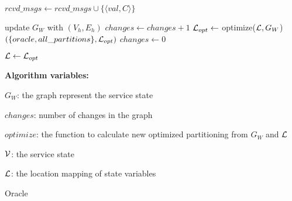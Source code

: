 \begin{algorithm}[htbp!]
\begin{distribalgo}[1]
\vspace{1.0mm}
	\STATE $rcvd\_msgs \leftarrow rcvd\_msgs \cup \{\langle val, C \rangle\}$
\ENDINDENT

\vspace{1.0mm}

	\STATE update $G_W$ with $(V_h,E_h)$
	\STATE $changes \leftarrow changes + 1$
		\STATE $\mathcal{L}_{opt}  \leftarrow$ optimize($\mathcal{L}, G_W$)
		\STATE \amcast$(\{oracle, all\_partitions\}, \mathcal{L}_{opt})$
		\STATE $changes \leftarrow 0$
	\ENDIF
\ENDINDENT

\vspace{1.0mm}

	\STATE $\mathcal{L} \leftarrow \mathcal{L}_{opt}$
\ENDINDENT

\vspace{1.5mm}

\textbf{Algorithm variables:}

\vspace{1mm}

$G_W$: the graph represent the service state

$changes$: number of changes in the graph

$optimize$: the function to calculate new optimized partitioning from $G_W$ and $\mathcal{L}$

$\mathcal{V}$: the service state

$\mathcal{L}$: the location mapping of state variables


\caption{Oracle}
\label{alg:dynastar-oracle_proxy}
\end{distribalgo}
\end{algorithm}



